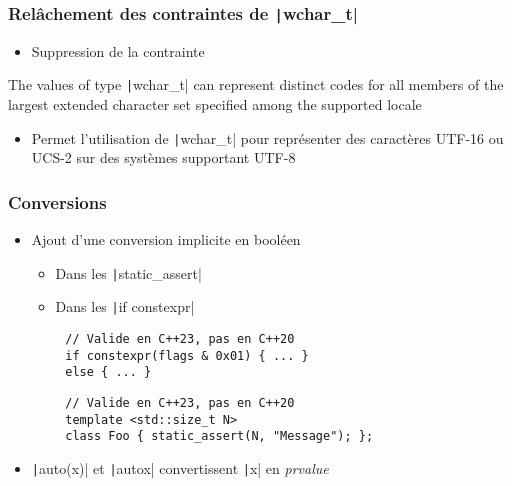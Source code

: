 \documentclass[C++.tex]{subfiles}
\begin{document}
\begin{frame}[fragile]
	\frametitle{Relâchement des contraintes de \texttt|wchar_t|}
	\begin{itemize}
		\item Suppression de la contrainte
	\end{itemize}

	\begin{block}{}
		The values of type \texttt|wchar_t| can represent distinct codes for all members of the largest extended character set specified among the supported locale
	\end{block}

	\begin{itemize}		
		\item Permet l'utilisation de \texttt|wchar_t| pour représenter des caractères UTF-16 ou UCS-2 sur des systèmes supportant UTF-8

	\end{itemize}
\end{frame}

\begin{frame}[fragile]
	\frametitle{Conversions}
	\begin{itemize}
		\item Ajout d'une conversion implicite en booléen
		\begin{itemize}
			\item Dans les \texttt|static_assert|
			\item Dans les \texttt|if constexpr|
		\end{itemize}
	\end{itemize}

	\begin{verbatim}
		// Valide en C++23, pas en C++20
		if constexpr(flags & 0x01) { ... }
		else { ... }
	\end{verbatim}

	\begin{verbatim}
		// Valide en C++23, pas en C++20
		template <std::size_t N>
		class Foo { static_assert(N, "Message"); };
	\end{verbatim}


	\begin{itemize}
		\item \texttt|auto(x)| et \texttt|auto{x}| convertissent \texttt|x| en \textit{prvalue}

	\end{itemize}
\end{frame}
\end{document}
